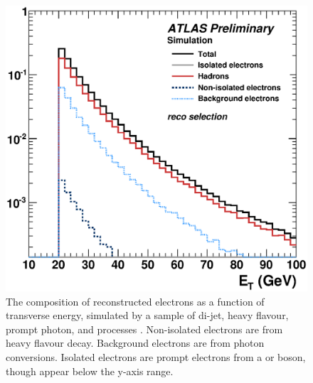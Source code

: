 \begin{figure}
	\includegraphics[width=\mediumfigwidth]{tex/selection/electron_composition}
	\caption{The composition of reconstructed electrons as a function of transverse 
	energy, simulated by a  sample of di-jet, heavy flavour, prompt photon, \PW 
	and \PZ processes \cite{ElectronPerf:Expect}. Non-isolated electrons are from heavy 
	flavour decay. Background electrons are from photon conversions. Isolated electrons 
	are prompt electrons from a \PW or \PZ boson, though appear below the y-axis range.}
	\label{fig:electron_composition}
\end{figure}


